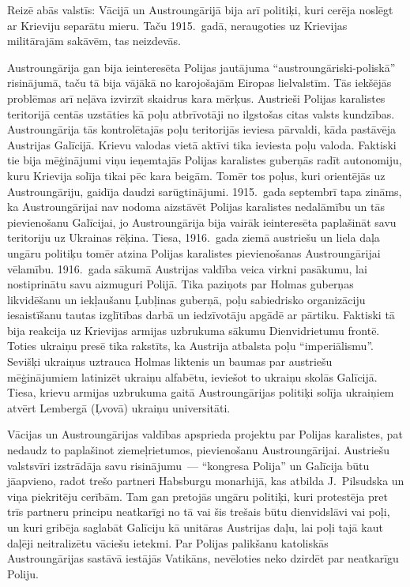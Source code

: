 \documentclass[twoside,a5paper,12pt,fleqn,openany]{extbook}
\begin{document}
Reizē abās valstīs: Vācijā un Austroungārijā bija arī politiķi, kuri cerēja noslēgt ar Krieviju separātu mieru. Taču 1915.~gadā, neraugoties uz Krievijas militārajām sakāvēm, tas neizdevās.

Austroungārija gan bija ieinteresēta Polijas jautājuma ``austroungāriski-poliskā'' risinājumā, taču tā bija vājākā no karojošajām Eiropas lielvalstīm. Tās iekšējās problēmas arī neļāva izvirzīt skaidrus kara mērķus. Austrieši Polijas karalistes teritorijā centās uzstāties kā poļu atbrīvotāji no ilgstošas citas valsts kundzības. Austroungārija tās kontrolētajās poļu teritorijās ieviesa pārvaldi, kāda pastāvēja Austrijas Galīcijā. Krievu valodas vietā aktīvi tika ieviesta poļu valoda. Faktiski tie bija mēģinājumi viņu ieņemtajās Polijas karalistes guberņās radīt autonomiju, kuru Krievija solīja tikai pēc kara beigām. Tomēr tos poļus, kuri orientējās uz Austroungāriju, gaidīja daudzi sarūgtinājumi. 1915.~gada septembrī tapa zināms, ka Austroungārijai nav nodoma aizstāvēt Polijas karalistes nedalāmību un tās pievienošanu Galīcijai, jo Austroungārija bija vairāk ieinteresēta paplašināt savu teritoriju uz Ukrainas rēķina. Tiesa, 1916.~gada ziemā austriešu un liela daļa ungāru politiķu tomēr atzina Polijas karalistes pievienošanas Austroungārijai vēlamību. 1916.~gada sākumā Austrijas valdība veica virkni pasākumu, lai nostiprinātu savu aizmuguri Polijā. Tika paziņots par Holmas guberņas likvidēšanu un iekļaušanu Ļubļinas guberņā, poļu sabiedrisko organizāciju iesaistīšanu tautas izglītības darbā un iedzīvotāju apgādē ar pārtiku. Faktiski tā bija reakcija uz Krievijas armijas uzbrukuma sākumu Dienvidrietumu frontē. Toties ukraiņu presē tika rakstīts, ka Austrija atbalsta poļu ``imperiālismu''. Sevišķi ukraiņus uztrauca Holmas liktenis un baumas par austriešu mēģinājumiem latinizēt ukraiņu alfabētu, ieviešot to ukraiņu skolās Galīcijā. Tiesa, krievu armijas uzbrukuma gaitā Austroungārijas politiķi solīja ukraiņiem atvērt Lembergā (Ļvovā) ukraiņu universitāti.

Vācijas un Austroungārijas valdības apsprieda projektu par Polijas karalistes, pat nedaudz to paplašinot ziemeļrietumos, pievienošanu Austroungārijai. Austriešu valstsvīri izstrādāja savu risinājumu~--- ``kongresa Polija'' un Galīcija būtu jāapvieno, radot trešo partneri Habsburgu monarhijā, kas atbilda J.~Pilsudska un viņa piekritēju cerībām. Tam gan pretojās ungāru politiķi, kuri protestēja pret trīs partneru principu neatkarīgi no tā vai šis trešais būtu dienvidslāvi vai poļi, un kuri gribēja saglabāt Galīciju kā unitāras Austrijas daļu, lai poļi tajā kaut daļēji neitralizētu vāciešu ietekmi. Par Polijas palikšanu katoliskās Austroungārijas sastāvā iestājās Vatikāns, nevēloties neko dzirdēt par neatkarīgu Poliju.
\end{document}
